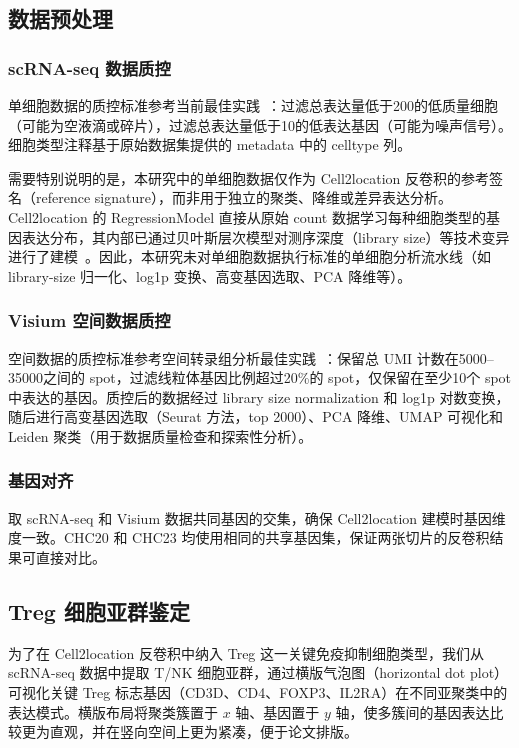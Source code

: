 \documentclass[12pt, a4paper]{ctexart}
\begin{document}
\subsection{数据预处理}

\subsubsection{scRNA-seq 数据质控}

单细胞数据的质控标准参考当前最佳实践~\cite{luecken2019current}：过滤总表达量低于200的低质量细胞（可能为空液滴或碎片），过滤总表达量低于10的低表达基因（可能为噪声信号）。细胞类型注释基于原始数据集提供的 metadata 中的 celltype 列。

需要特别说明的是，本研究中的单细胞数据仅作为 Cell2location 反卷积的参考签名（reference signature），而非用于独立的聚类、降维或差异表达分析。Cell2location 的 RegressionModel 直接从原始 count 数据学习每种细胞类型的基因表达分布，其内部已通过贝叶斯层次模型对测序深度（library size）等技术变异进行了建模~\cite{kleshchevnikov2022cell2location}。因此，本研究未对单细胞数据执行标准的单细胞分析流水线（如 library-size 归一化、log1p 变换、高变基因选取、PCA 降维等）。

\subsubsection{Visium 空间数据质控}

空间数据的质控标准参考空间转录组分析最佳实践~\cite{williams2022introduction, palla2022squidpy}：保留总 UMI 计数在5000--35000之间的 spot，过滤线粒体基因比例超过20\%的 spot，仅保留在至少10个 spot 中表达的基因。质控后的数据经过 library size normalization 和 log1p 对数变换，随后进行高变基因选取（Seurat 方法，top 2000）、PCA 降维、UMAP 可视化和 Leiden 聚类（用于数据质量检查和探索性分析）。

\subsubsection{基因对齐}

取 scRNA-seq 和 Visium 数据共同基因的交集，确保 Cell2location 建模时基因维度一致。CHC20 和 CHC23 均使用相同的共享基因集，保证两张切片的反卷积结果可直接对比。

\subsection{Treg 细胞亚群鉴定}

为了在 Cell2location 反卷积中纳入 Treg 这一关键免疫抑制细胞类型，我们从 scRNA-seq 数据中提取 T/NK 细胞亚群，通过横版气泡图（horizontal dot plot）可视化关键 Treg 标志基因（CD3D、CD4、FOXP3、IL2RA）在不同亚聚类中的表达模式。横版布局将聚类簇置于 $x$ 轴、基因置于 $y$ 轴，使多簇间的基因表达比较更为直观，并在竖向空间上更为紧凑，便于论文排版。
\end{document}
